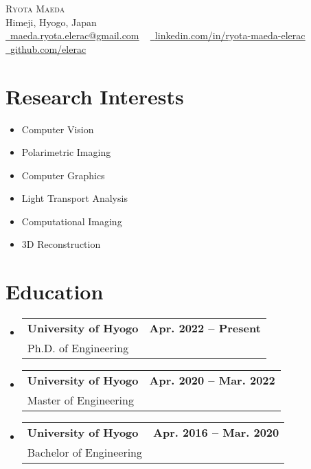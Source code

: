 \documentclass[letterpaper,11pt]{article}
\makeatletter
\newcommand{\resumeSubheading}[3]{
  \vspace{-2pt}\item
    \begin{tabular*}{1.0\textwidth}[t]{l@{\extracolsep{\fill}}r}
      \textbf{#1} & \textbf{\small #2} \\
      {\small#3} &  \\
    \end{tabular*}\vspace{-7pt}
}
\newcommand{\resumeSubHeadingListStart}{\begin{itemize}[leftmargin=0.0in, label={}]}
\newcommand{\resumeSubHeadingListEnd}{\end{itemize}}
\makeatother
\begin{document}

\begin{center}
    {\Huge \scshape Ryota Maeda} \\ \vspace{1pt}
    Himeji, Hyogo, Japan \\ \vspace{1pt}
    \small \href{mailto:maeda.ryota.elerac@gmail.com}{\raisebox{-0.2\height}\faEnvelope\  \underline{maeda.ryota.elerac@gmail.com}} ~ 
    \href{https://www.linkedin.com/in/ryota-maeda-elerac/}{\raisebox{-0.2\height}\faLinkedin\ \underline{linkedin.com/in/ryota-maeda-elerac}}  ~
    \href{https://github.com/elerac}{\raisebox{-0.2\height}\faGithub\ \underline{github.com/elerac}}
    \vspace{-8pt}
\end{center}

\section{Research Interests}
    \begin{multicols}{3}
        \begin{itemize}[itemsep=-5pt, parsep=3pt]
            \item\small Computer Vision
            \item Polarimetric Imaging
            \item Computer Graphics
            \item Light Transport Analysis
            \item Computational Imaging
            \item 3D Reconstruction
        \end{itemize}
    \end{multicols}
    \vspace*{2.0\multicolsep}

\section{Education}
  \resumeSubHeadingListStart
    \resumeSubheading
      {University of Hyogo}{Apr. 2022 -- Present}
      {Ph.D. of Engineering}
    \resumeSubheading
      {University of Hyogo}{Apr. 2020 -- Mar. 2022}
      {Master of Engineering}
    \resumeSubheading
      {University of Hyogo}{Apr. 2016 -- Mar. 2020}
      {Bachelor of Engineering}
  \resumeSubHeadingListEnd
\end{document}
